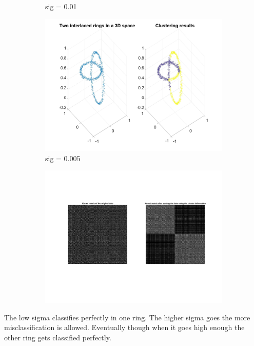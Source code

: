 \documentclass[11pt,oneside,a4paper]{article}
\begin{document}
\begin{figure}[H]
\begin{subfigure}[b]{0.4\textwidth}
		\caption{sig = 0.01}
	\end{subfigure}
	\begin{subfigure}[b]{0.4\textwidth}
		\includegraphics[width=\textwidth]{../Figures/sig005}
		\caption{sig = 0.005}
	\end{subfigure}
		\begin{subfigure}[b]{0.4\textwidth}
			\includegraphics[width=\textwidth]{../Figures/sig01m}
		\end{subfigure}
\end{figure}

The low sigma classifies perfectly in one ring. The higher sigma goes the more misclassification is allowed. Eventually though when it goes high enough the other ring gets classified perfectly.
\end{document}
